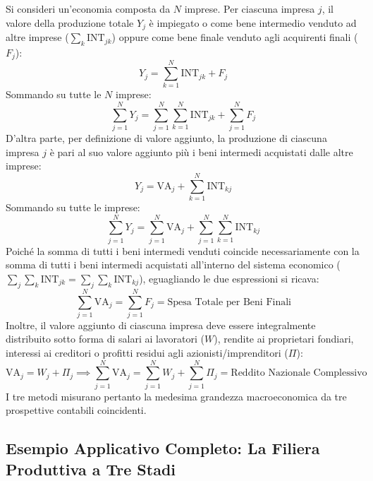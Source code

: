 \begin{dimostrazione}
Si consideri un'economia composta da $N$ imprese. Per ciascuna impresa $j$, il valore della produzione totale $Y_j$ è impiegato o come bene intermedio venduto ad altre imprese ($\sum_{k} \mathrm{INT}_{jk}$) oppure come bene finale venduto agli acquirenti finali ($F_j$):
\begin{equation}
    Y_j = \sum_{k=1}^N \mathrm{INT}_{jk} + F_j
\end{equation}
Sommando su tutte le $N$ imprese:
\begin{equation}
    \sum_{j=1}^N Y_j = \sum_{j=1}^N \sum_{k=1}^N \mathrm{INT}_{jk} + \sum_{j=1}^N F_j
\end{equation}
D'altra parte, per definizione di valore aggiunto, la produzione di ciascuna impresa $j$ è pari al suo valore aggiunto più i beni intermedi acquistati dalle altre imprese:
\begin{equation}
    Y_j = \mathrm{VA}_j + \sum_{k=1}^N \mathrm{INT}_{kj}
\end{equation}
Sommando su tutte le imprese:
\begin{equation}
    \sum_{j=1}^N Y_j = \sum_{j=1}^N \mathrm{VA}_j + \sum_{j=1}^N \sum_{k=1}^N \mathrm{INT}_{kj}
\end{equation}
Poiché la somma di tutti i beni intermedi venduti coincide necessariamente con la somma di tutti i beni intermedi acquistati all'interno del sistema economico ($\sum_{j}\sum_{k} \mathrm{INT}_{jk} = \sum_{j}\sum_{k} \mathrm{INT}_{kj}$), eguagliando le due espressioni si ricava:
\begin{equation}
    \sum_{j=1}^N \mathrm{VA}_j = \sum_{j=1}^N F_j = \text{Spesa Totale per Beni Finali}
\end{equation}
Inoltre, il valore aggiunto di ciascuna impresa deve essere integralmente distribuito sotto forma di salari ai lavoratori ($W$), rendite ai proprietari fondiari, interessi ai creditori o profitti residui agli azionisti/imprenditori ($\Pi$):
\begin{equation}
    \mathrm{VA}_j = W_j + \Pi_j \implies \sum_{j=1}^N \mathrm{VA}_j = \sum_{j=1}^N W_j + \sum_{j=1}^N \Pi_j = \text{Reddito Nazionale Complessivo}
\end{equation}
I tre metodi misurano pertanto la medesima grandezza macroeconomica da tre prospettive contabili coincidenti.
\end{dimostrazione}

\subsection{Esempio Applicativo Completo: La Filiera Produttiva a Tre Stadi}

